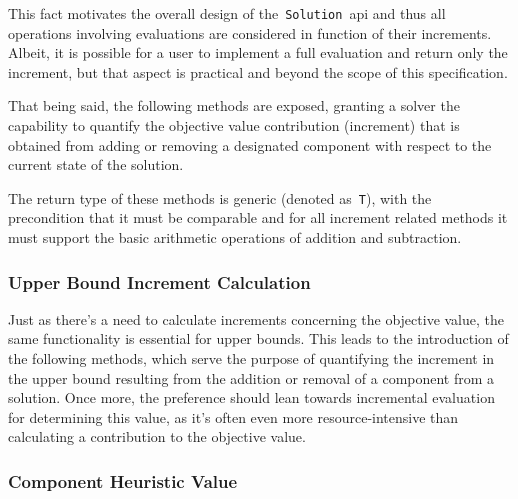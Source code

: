 This fact motivates the overall design of the~\texttt{Solution}~\acrshort{api}
and thus all operations involving evaluations are considered in function of
their increments. Albeit, it is possible for a user to implement
a full evaluation and return only the increment, but that aspect is
practical and beyond the scope of this specification.

That being said, the following methods are exposed, granting a solver the
capability to quantify the objective value contribution (increment) that is
obtained from adding or removing a designated component with respect to the
current state of the solution.

\begin{center}

\end{center}

The return type of these methods is generic (denoted as~\texttt{T}), with the
precondition that it must be comparable and for all increment related methods it
must support the basic arithmetic operations of addition and subtraction.

\subsubsection*{Upper Bound Increment Calculation}

Just as there's a need to calculate increments concerning the objective value,
the same functionality is essential for upper bounds. This leads to the
introduction of the following methods, which serve the purpose of quantifying
the increment in the upper bound resulting from the addition or
removal of a component from a solution. Once more, the preference should lean
towards incremental evaluation for determining this value, as it's often even
more resource-intensive than calculating a contribution to the objective value.

\begin{center}

\end{center}

\subsubsection*{Component Heuristic Value}

